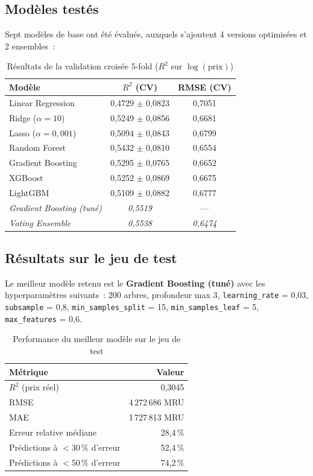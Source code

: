 \documentclass[12pt, a4paper]{article}
\begin{document}
\subsection{Modèles testés}

Sept modèles de base ont été évalués, auxquels s'ajoutent 4 versions optimisées et 2 ensembles~:

\begin{table}[H]
\centering
\caption{Résultats de la validation croisée 5-fold ($R^2$ sur $\log(\text{prix})$)}
\label{tab:cv_results}
\begin{tabular}{lcc}
\toprule
\textbf{Modèle} & \textbf{$R^2$ (CV)} & \textbf{RMSE (CV)} \\
\midrule
Linear Regression & 0,4729 $\pm$ 0,0823 & 0,7051 \\
Ridge ($\alpha = 10$) & 0,5249 $\pm$ 0,0856 & 0,6681 \\
Lasso ($\alpha = 0,001$) & 0,5094 $\pm$ 0,0843 & 0,6799 \\
Random Forest & 0,5432 $\pm$ 0,0810 & 0,6554 \\
Gradient Boosting & 0,5295 $\pm$ 0,0765 & 0,6652 \\
XGBoost & 0,5252 $\pm$ 0,0869 & 0,6675 \\
LightGBM & 0,5109 $\pm$ 0,0882 & 0,6777 \\
\midrule
\textit{Gradient Boosting (tuné)} & \textit{0,5519} & --- \\
\textit{Voting Ensemble} & \textit{0,5538} & \textit{0,6474} \\
\bottomrule
\end{tabular}
\end{table}

\subsection{Résultats sur le jeu de test}

Le meilleur modèle retenu est le \textbf{Gradient Boosting (tuné)} avec les hyperparamètres suivants~: 200 arbres, profondeur max 3, \texttt{learning\_rate} = 0,03, \texttt{subsample} = 0,8, \texttt{min\_samples\_split} = 15, \texttt{min\_samples\_leaf} = 5, \texttt{max\_features} = 0,6.

\begin{table}[H]
\centering
\caption{Performance du meilleur modèle sur le jeu de test}
\label{tab:test_results}
\begin{tabular}{lr}
\toprule
\textbf{Métrique} & \textbf{Valeur} \\
\midrule
$R^2$ (prix réel) & 0,3045 \\
RMSE & 4\,272\,686 MRU \\
MAE & 1\,727\,813 MRU \\
Erreur relative médiane & 28,4\,\% \\
Prédictions à $< 30\,\%$ d'erreur & 52,4\,\% \\
Prédictions à $< 50\,\%$ d'erreur & 74,2\,\% \\
\bottomrule
\end{tabular}
\end{table}
\end{document}
